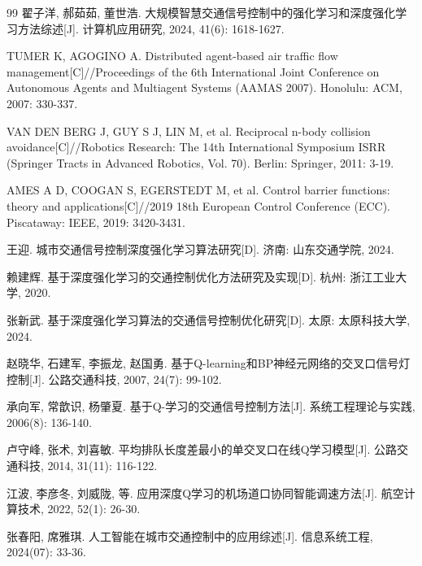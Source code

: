 \documentclass[12pt,a4paper,UTF8]{ctexart}
\begin{document}
\begin{thebibliography}{99}
 翟子洋, 郝茹茹, 董世浩. 大规模智慧交通信号控制中的强化学习和深度强化学习方法综述[J]. 计算机应用研究, 2024, 41(6): 1618-1627.

 TUMER K, AGOGINO A. Distributed agent-based air traffic flow management[C]//Proceedings of the 6th International Joint Conference on Autonomous Agents and Multiagent Systems (AAMAS 2007). Honolulu: ACM, 2007: 330-337.

 VAN DEN BERG J, GUY S J, LIN M, et al. Reciprocal n-body collision avoidance[C]//Robotics Research: The 14th International Symposium ISRR (Springer Tracts in Advanced Robotics, Vol. 70). Berlin: Springer, 2011: 3-19.

 AMES A D, COOGAN S, EGERSTEDT M, et al. Control barrier functions: theory and applications[C]//2019 18th European Control Conference (ECC). Piscataway: IEEE, 2019: 3420-3431.

 王迎. 城市交通信号控制深度强化学习算法研究[D]. 济南: 山东交通学院, 2024.

 赖建辉. 基于深度强化学习的交通控制优化方法研究及实现[D]. 杭州: 浙江工业大学, 2020.

 张新武. 基于深度强化学习算法的交通信号控制优化研究[D]. 太原: 太原科技大学, 2024.

 赵晓华, 石建军, 李振龙, 赵国勇. 基于Q-learning和BP神经元网络的交叉口信号灯控制[J]. 公路交通科技, 2007, 24(7): 99-102.

 承向军, 常歆识, 杨肇夏. 基于Q-学习的交通信号控制方法[J]. 系统工程理论与实践, 2006(8): 136-140.

 卢守峰, 张术, 刘喜敏. 平均排队长度差最小的单交叉口在线Q学习模型[J]. 公路交通科技, 2014, 31(11): 116-122.

 江波, 李彦冬, 刘威陇, 等. 应用深度Q学习的机场道口协同智能调速方法[J]. 航空计算技术, 2022, 52(1): 26-30.

 张春阳, 席雅琪. 人工智能在城市交通控制中的应用综述[J]. 信息系统工程, 2024(07): 33-36.


\end{thebibliography}
\end{document}
